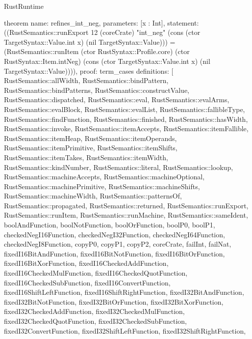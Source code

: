 \begin{lexlean}{RustRuntime}
\begin{semanticmodule}
theorem{
  name: refines_int_neg,
  parameters: [x : Int],
  statement: ((RustSemantics::runExport 12 (coreCrate) "int_neg" (cons (ctor TargetSyntax::Value.int x) (nil TargetSyntax::Value))) = (RustSemantics::runItem (ctor RustSyntax::Profile.core) (ctor RustSyntax::Item.intNeg) (cons (ctor TargetSyntax::Value.int x) (nil TargetSyntax::Value)))),
  proof: term_cases{
    definitions: [
      RustSemantics::allWidth,
      RustSemantics::bindPattern,
      RustSemantics::bindPatterns,
      RustSemantics::constructValue,
      RustSemantics::dispatched,
      RustSemantics::eval,
      RustSemantics::evalArms,
      RustSemantics::evalBlock,
      RustSemantics::evalList,
      RustSemantics::fallibleType,
      RustSemantics::findFunction,
      RustSemantics::finished,
      RustSemantics::hasWidth,
      RustSemantics::invoke,
      RustSemantics::itemAccepts,
      RustSemantics::itemFallible,
      RustSemantics::itemHeap,
      RustSemantics::itemOperands,
      RustSemantics::itemPrimitive,
      RustSemantics::itemShifts,
      RustSemantics::itemTakes,
      RustSemantics::itemWidth,
      RustSemantics::kindNumber,
      RustSemantics::literal,
      RustSemantics::lookup,
      RustSemantics::machineAccepts,
      RustSemantics::machineOptional,
      RustSemantics::machinePrimitive,
      RustSemantics::machineShifts,
      RustSemantics::machineWidth,
      RustSemantics::patternsOf,
      RustSemantics::propagated,
      RustSemantics::returned,
      RustSemantics::runExport,
      RustSemantics::runItem,
      RustSemantics::runMachine,
      RustSemantics::sameIdent,
      boolAndFunction,
      boolNotFunction,
      boolOrFunction,
      boolP0,
      boolP1,
      checkedNegI16Function,
      checkedNegI32Function,
      checkedNegI64Function,
      checkedNegI8Function,
      copyP0,
      copyP1,
      copyP2,
      coreCrate,
      failInt,
      failNat,
      fixedI16BitAndFunction,
      fixedI16BitNotFunction,
      fixedI16BitOrFunction,
      fixedI16BitXorFunction,
      fixedI16CheckedAddFunction,
      fixedI16CheckedMulFunction,
      fixedI16CheckedQuotFunction,
      fixedI16CheckedSubFunction,
      fixedI16ConvertFunction,
      fixedI16ShiftLeftFunction,
      fixedI16ShiftRightFunction,
      fixedI32BitAndFunction,
      fixedI32BitNotFunction,
      fixedI32BitOrFunction,
      fixedI32BitXorFunction,
      fixedI32CheckedAddFunction,
      fixedI32CheckedMulFunction,
      fixedI32CheckedQuotFunction,
      fixedI32CheckedSubFunction,
      fixedI32ConvertFunction,
      fixedI32ShiftLeftFunction,
      fixedI32ShiftRightFunction,
}}
\end{semanticmodule}
\end{lexlean}
